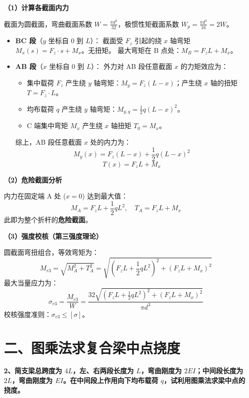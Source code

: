 \documentclass[UTF8,fontset=windows]{ctexart}
\begin{document}
\textbf{（1）计算各截面内力}

截面为圆截面，弯曲截面系数 $W = \frac{\pi d^3}{32}$，极惯性矩截面系数 $W_p = \frac{\pi d^3}{16} = 2W$。
\begin{itemize}
    \item \textbf{BC 段}（$y$ 坐标自 0 到 $L$）：
    截面受 $F_z$ 引起的绕 $x$ 轴弯矩 $M_x(s) = F_z \cdot s + M_x$。无扭矩。
    最大弯矩在 B 点处：$M_B = F_z L + M_x$。
    \item \textbf{AB 段}（$x$ 坐标自 0 到 $L$）：
    外力对 AB 段任意截面 $x$ 的力矩效应为：
    \begin{itemize}
        \item 集中载荷 $F_z$ 产生绕 $y$ 轴弯矩：$M_y = F_z (L - x)$；产生绕 $x$ 轴的扭矩 $T = F_z \cdot L$。
        \item 均布载荷 $q$ 产生绕 $y$ 轴弯矩：$M_{y, q} = \frac{1}{2}q(L - x)^2$。
        \item C 端集中弯矩 $M_x$ 产生绕 $x$ 轴扭矩 $T_0 = M_x$。
    \end{itemize}
    综上，AB 段任意截面 $x$ 处的内力为：
    \[
        M_y(x) = F_z(L - x) + \frac{1}{2}q(L - x)^2
    \]
    \[
        T(x) = F_z L + M_x
    \]
\end{itemize}

\textbf{（2）危险截面分析}

内力在固定端 A 处 ($x = 0$) 达到最大值：
\[
    M_A = F_z L + \frac{1}{2}q L^2, \quad T_A = F_z L + M_x
\]
此即为整个折杆的\textbf{危险截面}。

\textbf{（3）强度校核（第三强度理论）}

圆截面弯扭组合，等效弯矩为：
\[
    M_{r3} = \sqrt{M_A^2 + T_A^2} = \sqrt{\left(F_z L + \frac{1}{2}q L^2\right)^2 + (F_z L + M_x)^2}
\]
最大当量应力为：
\[
    \sigma_{r3} = \frac{M_{r3}}{W} = \frac{32 \sqrt{\left(F_z L + \frac{1}{2}q L^2\right)^2 + (F_z L + M_x)^2}}{\pi d^3}
\]
校核强度准则：$\sigma_{r3} \le [\sigma]$。

\newpage

\section*{二、图乘法求复合梁中点挠度}

\textbf{2、简支梁总跨度为 $4L$，左、右两段长度为 $L$，弯曲刚度为 $2EI$；中间段长度为 $2L$，弯曲刚度为 $EI$。在中间段上作用向下均布载荷 $q$，试利用图乘法求梁中点的挠度。}
\end{document}

